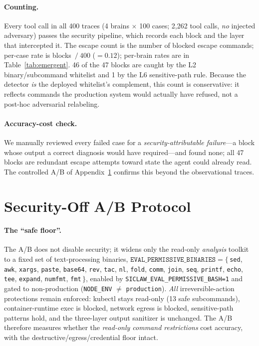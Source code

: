 \documentclass[letterpaper]{article}
\begin{document}
\paragraph{Counting.}
Every tool call in all 400 traces (4 brains $\times$ 100 cases; 2{,}262 tool calls, \emph{no} injected adversary) passes the security pipeline, which records each block and the layer that intercepted it.
The escape count is the number of blocked escape commands; per-case rate is blocks~$/~400$ ($=0.12$); per-brain rates are in Table~\ref{tab:emergent}.
46 of the 47 blocks are caught by the L2 binary/subcommand whitelist and 1 by the L6 sensitive-path rule.
Because the detector \emph{is} the deployed whitelist's complement, this count is conservative: it reflects commands the production system would actually have refused, not a post-hoc adversarial relabeling.

\paragraph{Accuracy-cost check.}
We manually reviewed every failed case for a \emph{security-attributable failure}---a block whose output a correct diagnosis would have required---and found none; all 47 blocks are redundant escape attempts toward state the agent could already read.
The controlled A/B of Appendix~\ref{app:abtest} confirms this beyond the observational traces.

\section{Security-Off A/B Protocol}
\label{app:abtest}

\paragraph{The ``safe floor''.}
The A/B does not disable security; it widens only the read-only \emph{analysis} toolkit to a fixed set of text-processing binaries, $\texttt{EVAL\_PERMISSIVE\_BINARIES} = \{$\,\texttt{sed}, \texttt{awk}, \texttt{xargs}, \texttt{paste}, \texttt{base64}, \texttt{rev}, \texttt{tac}, \texttt{nl}, \texttt{fold}, \texttt{comm}, \texttt{join}, \texttt{seq}, \texttt{printf}, \texttt{echo}, \texttt{tee}, \texttt{expand}, \texttt{numfmt}, \texttt{fmt}\,$\}$, enabled by \texttt{SICLAW\_EVAL\_PERMISSIVE\_BASH=1} and gated to non-production (\texttt{NODE\_ENV} $\ne$ \texttt{production}).
\emph{All} irreversible-action protections remain enforced: kubectl stays read-only (13 safe subcommands), container-runtime exec is blocked, network egress is blocked, sensitive-path patterns hold, and the three-layer output sanitizer is unchanged.
The A/B therefore measures whether the \emph{read-only command restrictions} cost accuracy, with the destructive/egress/credential floor intact.
\end{document}
